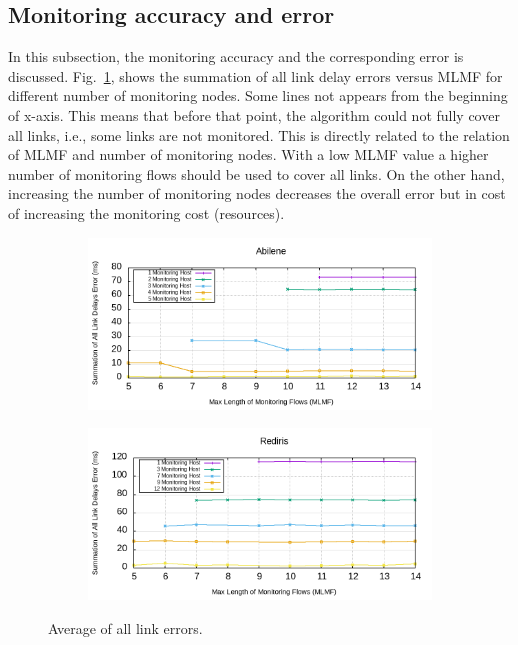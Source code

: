 \documentclass[10pt, journal, letterpaper]{IEEEtran}
\begin{document}
\subsection{Monitoring accuracy and error}\label{subsec:eval_accuracy_and_error}
In this subsection, the monitoring accuracy and the corresponding error is discussed. Fig.~\ref{fig:sum_delay_abilene}, shows the summation of all link delay errors versus MLMF for different number of monitoring nodes. Some lines not appears from the beginning of x-axis. This means that before that point, the algorithm could not fully cover all links, i.e., some links are not monitored. This is directly related to the relation of MLMF and number of monitoring nodes. With a low MLMF value a higher number of monitoring flows should be used to cover all links. On the other hand, increasing the number of monitoring nodes decreases the overall error but in cost of increasing the monitoring cost (resources).
\begin{figure}
    \begin{subfigure}{\columnwidth}
       \centering
        \includegraphics[width=.8\columnwidth]{img/eval_Abilene_Max_Length_of_Summation_of_All_Links_Error.png}
    \end{subfigure}
    \begin{subfigure}{\columnwidth}
      \centering
      \includegraphics[width=.8\columnwidth]{img/eval_Rediris_Max_Length_of_Summation_of_All_Links_Error.png}
    \end{subfigure}
    \caption{Average of all link errors.}
    \label{fig:sum_delay_abilene}
\end{figure} 
\end{document}
